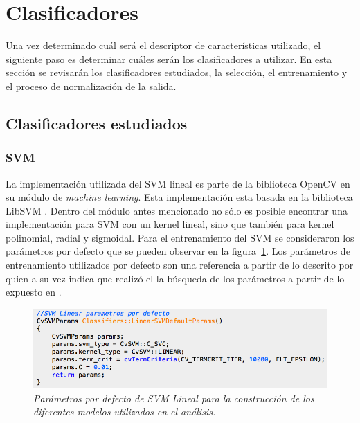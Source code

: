 \section{Clasificadores}
\label{sec:clasif}
 
Una vez determinado cuál será el descriptor de características utilizado, el siguiente paso es determinar cuáles serán los clasificadores a utilizar. En esta sección se revisarán los clasificadores estudiados, la selección, el entrenamiento y el proceso de normalización de la salida.

\subsection{Clasificadores estudiados}

\subsubsection{SVM}
\label{propuestas:svmlineal}

La implementación utilizada del SVM lineal es parte de la biblioteca OpenCV en su módulo de \textit{machine learning}. Esta implementación esta basada en la biblioteca LibSVM \citep{Chang2011}. Dentro del módulo antes mencionado no sólo es posible encontrar una implementación para SVM con un kernel lineal, sino que también para kernel polinomial, radial y sigmoidal.
Para el entrenamiento del SVM se consideraron los parámetros por defecto que se pueden observar en la figura~\ref{fig:svmparams}. Los parámetros de entrenamiento utilizados por defecto son una referencia a partir de lo descrito por \cite{dalal2006} quien a su vez indica que realizó el la búsqueda de los parámetros a partir de lo expuesto en \citep{joachims1999making}. 

\begin{figure}[htc]
  \centering
  \includegraphics[scale=.5]{images/svmparams}
  \caption{\em Parámetros por defecto de SVM Lineal para la construcción de los diferentes modelos utilizados en el análisis. }  
  \label{fig:svmparams}
\end{figure}

